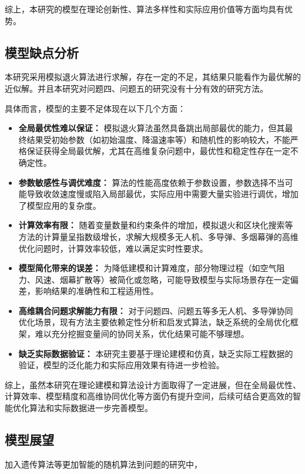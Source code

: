 \documentclass{article}
\begin{document}
综上，本研究的模型在理论创新性、算法多样性和实际应用价值等方面均具有优势。

\subsection{模型缺点分析}
本研究采用模拟退火算法进行求解，存在一定的不足，其结果只能看作为最优解的近似解。并且本研究对问题四、问题五的研究没有十分有效的研究方法。

具体而言，模型的主要不足体现在以下几个方面：

\begin{itemize}
    \item \textbf{全局最优性难以保证：} 模拟退火算法虽然具备跳出局部最优的能力，但其最终结果受初始参数（如初始温度、降温速率等）和随机性的影响较大，不能严格保证获得全局最优解，尤其在高维复杂问题中，最优性和稳定性存在一定不确定性。
    \item \textbf{参数敏感性与调优难度：} 算法的性能高度依赖于参数设置，参数选择不当可能导致收敛速度慢或陷入局部最优，实际应用中需要大量实验进行调优，增加了模型应用的复杂度。
    \item \textbf{计算效率有限：} 随着变量数量和约束条件的增加，模拟退火和区块化搜索等方法的计算量呈指数级增长，求解大规模多无人机、多导弹、多烟幕弹的高维优化问题时，计算效率较低，难以满足实时性要求。
    \item \textbf{模型简化带来的误差：} 为降低建模和计算难度，部分物理过程（如空气阻力、风速、烟幕扩散等）被简化或忽略，可能导致模型与实际场景存在一定偏差，影响结果的准确性和工程适用性。
    \item \textbf{高维耦合问题求解能力有限：} 对于问题四、问题五等多无人机、多导弹协同优化场景，现有方法主要依赖定性分析和启发式算法，缺乏系统的全局优化框架，难以充分挖掘变量间的协同关系，优化结果可能不够理想。
    \item \textbf{缺乏实际数据验证：} 本研究主要基于理论建模和仿真，缺乏实际工程数据的验证，模型的泛化能力和实际应用效果有待进一步检验。
\end{itemize}

综上，虽然本研究在理论建模和算法设计方面取得了一定进展，但在全局最优性、计算效率、模型精度和高维协同优化等方面仍有提升空间，后续可结合更高效的智能优化算法和实际数据进一步完善模型。

\subsection{模型展望}
加入遗传算法等更加智能的随机算法到问题的研究中，
\end{document}
